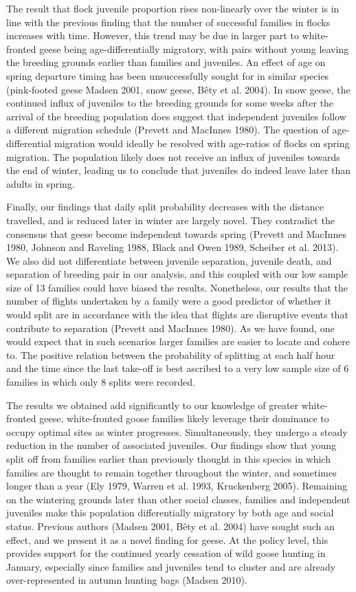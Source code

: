 \documentclass[10pt,twocolumn]{paper}
\begin{document}
The result that flock juvenile proportion rises non-linearly over the
winter is in line with the previous finding that the number of
successful families in flocks increases with time. However, this trend
may be due in larger part to white-fronted geese being
age-differentially migratory, with pairs without young leaving the
breeding grounds earlier than families and juveniles. An effect of age
on spring departure timing has been unsuccessfully sought for in similar
species (pink-footed geese Madsen 2001, snow geese, Bêty et al. 2004).
In snow geese, the continued influx of juveniles to the breeding grounds
for some weeks after the arrival of the breeding population does suggest
that independent juveniles follow a different migration schedule
(Prevett and MacInnes 1980). The question of age-differential migration
would ideally be resolved with age-ratios of flocks on spring migration.
The population likely does not receive an influx of juveniles towards
the end of winter, leading us to conclude that juveniles do indeed leave
later than adults in spring.

Finally, our findings that daily split probability decreases with the
distance travelled, and is reduced later in winter are largely novel.
They contradict the consensus that geese become independent towards
spring (Prevett and MacInnes 1980, Johnson and Raveling 1988, Black and
Owen 1989, Scheiber et al. 2013). We also did not differentiate between
juvenile separation, juvenile death, and separation of breeding pair in
our analysis, and this coupled with our low sample size of 13 families
could have biased the results. Nonetheless, our results that the number
of flights undertaken by a family were a good predictor of whether it
would split are in accordance with the idea that flights are disruptive
events that contribute to separation (Prevett and MacInnes 1980). As we
have found, one would expect that in such scenarios larger families are
easier to locate and cohere to. The positive relation between the
probability of splitting at each half hour and the time since the last
take-off is best ascribed to a very low sample size of 6 families in
which only 8 splits were recorded.

The results we obtained add significantly to our knowledge of greater
white-fronted geese. white-fronted goose families likely leverage their
dominance to occupy optimal sites as winter progresses. Simultaneously,
they undergo a steady reduction in the number of associated juveniles.
Our findings show that young split off from families earlier than
previously thought in this species in which families are thought to
remain together throughout the winter, and sometimes longer than a year
(Ely 1979, Warren et al. 1993, Kruckenberg 2005). Remaining on the
wintering grounds later than other social classes, families and
independent juveniles make this population differentially migratory by
both age and social status. Previous authors (Madsen 2001, Bêty et al.
2004) have sought such an effect, and we present it as a novel finding
for geese. At the policy level, this provides support for the continued
yearly cessation of wild goose hunting in January, especially since
families and juveniles tend to cluster and are already over-represented
in autumn hunting bags (Madsen 2010).
\end{document}
